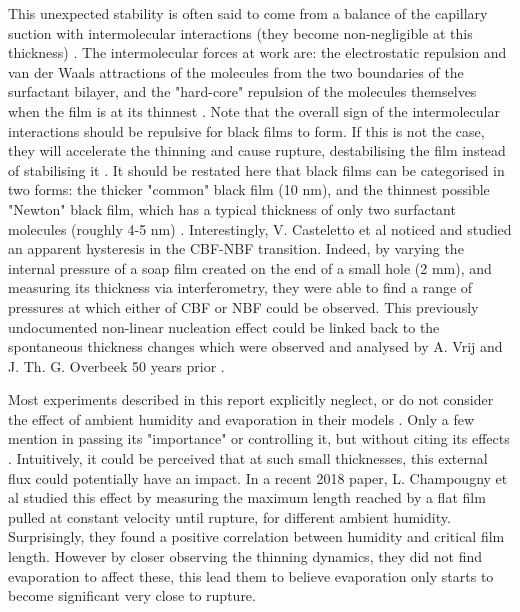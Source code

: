 \documentclass[a4paper,12pt]{article}
\numberwithin{equation}{section}
\numberwithin{figure}{section}
\numberwithin{table}{section}
\begin{document}
This unexpected stability is often said to come from a balance of the capillary suction with intermolecular interactions (they become non-negligible at this thickness) \cite{Breward2002, ChampougnyEvap2018, Cantat2010, Vrij1968, VrijDiscussion1966}. The intermolecular forces at work are: the electrostatic repulsion and van der Waals attractions of the molecules from the two boundaries of the surfactant bilayer, and the "hard-core" repulsion of the molecules themselves when the film is at its thinnest \cite{Casteletto2003}. Note that the overall sign of the intermolecular interactions should be repulsive for black films to form. If this is not the case, they will accelerate the thinning and cause rupture, destabilising the film instead of stabilising it \cite{VrijDiscussion1966, Langevin1994, Debregeas1998}. It should be restated here that black films can be categorised in two forms: the thicker "common" black film (10 nm), and the thinnest possible "Newton" black film, which has a typical thickness of only two surfactant molecules (roughly 4-5 nm) \cite{Casteletto2003, Seung2006}. Interestingly, V. Casteletto et al \cite{Casteletto2003} noticed and studied an apparent hysteresis in the CBF-NBF transition. Indeed, by varying the internal pressure of a soap film created on the end of a small hole (2 mm), and measuring its thickness via interferometry, they were able to find a range of pressures at which either of CBF or NBF could be observed. This previously undocumented non-linear nucleation effect could be linked back to the spontaneous thickness changes which were observed and analysed by A. Vrij and J. Th. G. Overbeek 50 years prior \cite{Vrij1968}.

Most experiments described in this report explicitly neglect, or do not consider the effect of ambient humidity and evaporation in their models \cite{Manev1974, Zheng1983}. Only a few mention in passing its "importance" or controlling it, but without citing its effects \cite{Langevin1994}. Intuitively, it could be perceived that at such small thicknesses, this external flux could potentially have an impact. In a recent 2018 paper, L. Champougny et al \cite{ChampougnyEvap2018} studied this effect by measuring the maximum length reached by a flat film pulled at constant velocity until rupture, for different ambient humidity. Surprisingly, they found a positive correlation between humidity and critical film length. However by closer observing the thinning dynamics, they did not find evaporation to affect these, this lead them to believe evaporation only starts to become significant very close to rupture.
\end{document}
